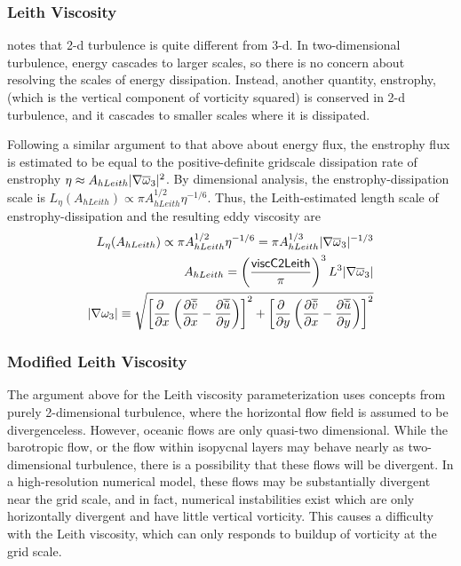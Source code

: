 \subsubsection{Leith Viscosity}
\citet{Leith68,Leith96} notes that 2-d turbulence is quite different
from 3-d.  In two-dimensional turbulence, energy cascades to larger
scales, so there is no concern about resolving the scales of energy
dissipation.  Instead, another quantity, enstrophy, (which is the
vertical component of vorticity squared) is conserved in 2-d
turbulence, and it cascades to smaller scales where it is dissipated.

Following a similar argument to that above about energy flux, the
enstrophy flux is estimated to be equal to the positive-definite
gridscale dissipation rate of enstrophy $\eta\approx A_{hLeith}
|\nabla\overline{\omega}_3|^2$.  By dimensional analysis, the
enstrophy-dissipation scale is $L_\eta(A_{hLeith})\propto\pi
A_{hLeith}^{1/2}\eta^{-1/6}$.  Thus, the Leith-estimated length scale
of enstrophy-dissipation and the resulting eddy viscosity are
\begin{eqnarray}
L_\eta(A_{hLeith})\propto\pi A_{hLeith}^{1/2}\eta^{-1/6}=\pi A_{hLeith}^{1/3}|\nabla \overline{\omega}_3|^{-1/3}\\
A_{hLeith}=\left(\frac{{\sf viscC2Leith}}{\pi}\right)^3L^3|\nabla \overline{\omega}_3|\\
|\nabla\omega_3|\equiv\sqrt{\left[{\frac{\partial{\ }}{\partial x}}\left({\frac{\partial{\overline{{\tilde v}}}}{\partial x}}-{\frac{\partial{\overline{{\tilde u}}}}{\partial y}}\right)\right]^2+\left[{\frac{\partial{\ }}{\partial y}}\left({\frac{\partial{\overline{{\tilde v}}}}{\partial x}}-{\frac{\partial{\overline{{\tilde u}}}}{\partial y}}\right)\right]^2}
\end{eqnarray}

\subsubsection{Modified Leith Viscosity}
The argument above for the Leith viscosity parameterization uses
concepts from purely 2-dimensional turbulence, where the horizontal
flow field is assumed to be divergenceless.  However, oceanic flows
are only quasi-two dimensional.  While the barotropic flow, or the
flow within isopycnal layers may behave nearly as two-dimensional
turbulence, there is a possibility that these flows will be divergent.
In a high-resolution numerical model, these flows may be substantially
divergent near the grid scale, and in fact, numerical instabilities
exist which are only horizontally divergent and have little vertical
vorticity.  This causes a difficulty with the Leith viscosity, which
can only responds to buildup of vorticity at the grid scale.

